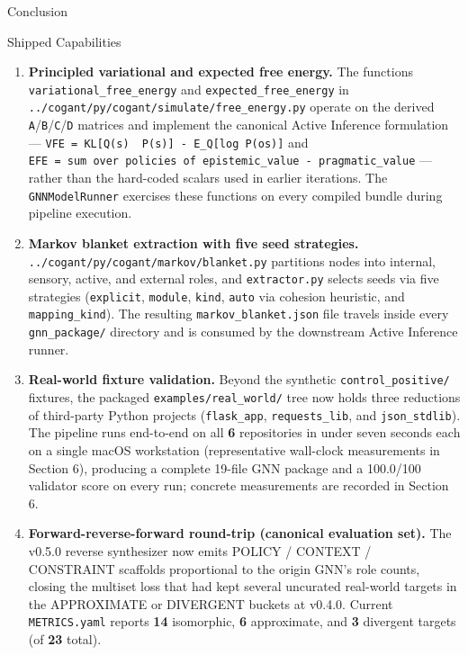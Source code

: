 \documentclass[
  ignorenonframetext,
]{beamer}
\begin{document}
\begin{frame}[fragile]{Conclusion}
\begin{block}{Shipped Capabilities}
\begin{enumerate}
  valid probability distributions, so the emitted bundle is directly
  compliant with the Active Inference Institute's upstream GNN
  validator.
\item
  \textbf{Principled variational and expected free energy.} The
  functions \texttt{variational\_free\_energy} and
  \texttt{expected\_free\_energy} in
  \texttt{../cogant/py/cogant/simulate/free\_energy.py} operate on the
  derived \texttt{A}/\texttt{B}/\texttt{C}/\texttt{D} matrices and
  implement the canonical Active Inference formulation ---
  \texttt{VFE\ =\ KL{[}Q(s)\ \textbar{}\textbar{}\ P(s){]}\ -\ E\_Q{[}log\ P(o\textbar{}s){]}}
  and
  \texttt{EFE\ =\ sum\ over\ policies\ of\ epistemic\_value\ -\ pragmatic\_value}
  --- rather than the hard-coded scalars used in earlier iterations. The
  \texttt{GNNModelRunner} exercises these functions on every compiled
  bundle during pipeline execution.
\item
  \textbf{Markov blanket extraction with five seed strategies.}
  \texttt{../cogant/py/cogant/markov/blanket.py} partitions nodes into
  internal, sensory, active, and external roles, and
  \texttt{extractor.py} selects seeds via five strategies
  (\texttt{explicit}, \texttt{module}, \texttt{kind}, \texttt{auto} via
  cohesion heuristic, and \texttt{mapping\_kind}). The resulting
  \texttt{markov\_blanket.json} file travels inside every
  \texttt{gnn\_package/} directory and is consumed by the downstream
  Active Inference runner.
\item
  \textbf{Real-world fixture validation.} Beyond the synthetic
  \texttt{control\_positive/} fixtures, the packaged
  \texttt{examples/real\_world/} tree now holds three reductions of
  third-party Python projects (\texttt{flask\_app},
  \texttt{requests\_lib}, and \texttt{json\_stdlib}). The pipeline runs
  end-to-end on all \textbf{6} repositories in under seven seconds each
  on a single macOS workstation (representative wall-clock measurements
  in Section 6), producing a complete 19-file GNN package and a
  100.0/100 validator score on every run; concrete measurements are
  recorded in Section 6.
\item
  \textbf{Forward-reverse-forward round-trip (canonical evaluation
  set).} The v0.5.0 reverse synthesizer now emits POLICY / CONTEXT /
  CONSTRAINT scaffolds proportional to the origin GNN's role counts,
  closing the multiset loss that had kept several uncurated real-world
  targets in the APPROXIMATE or DIVERGENT buckets at v0.4.0. Current
  \texttt{METRICS.yaml} reports \textbf{14} isomorphic, \textbf{6}
  approximate, and \textbf{3} divergent targets (of \textbf{23} total).

\end{enumerate}
\end{block}
\end{frame}
\end{document}
